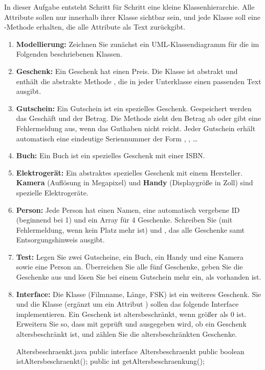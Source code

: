 In dieser Aufgabe entsteht Schritt für Schritt eine kleine Klassenhierarchie. Alle Attribute sollen nur innerhalb ihrer Klasse sichtbar sein, und jede Klasse soll eine -Methode erhalten, die alle Attribute als Text zurückgibt.
\begin{enumerate}[label=\alph*)]
\item \textbf{Modellierung:} Zeichnen Sie zunächst ein UML-Klassendiagramm für die im Folgenden beschriebenen Klassen.
\item \textbf{Geschenk:} Ein Geschenk hat einen Preis. Die Klasse ist abstrakt und enthält die abstrakte Methode , die in jeder Unterklasse einen passenden Text ausgibt.
\item \textbf{Gutschein:} Ein Gutschein ist ein spezielles Geschenk. Gespeichert werden das Geschäft und der Betrag. Die Methode  zieht den Betrag ab oder gibt eine Fehlermeldung aus, wenn das Guthaben nicht reicht. Jeder Gutschein erhält automatisch eine eindeutige Seriennummer der Form , , \ldots
\item \textbf{Buch:} Ein Buch ist ein spezielles Geschenk mit einer ISBN.
\item \textbf{Elektrogerät:} Ein abstraktes spezielles Geschenk mit einem Hersteller. \textbf{Kamera} (Auflösung in Megapixel) und \textbf{Handy} (Displaygröße in Zoll) sind spezielle Elektrogeräte.
\item \textbf{Person:} Jede Person hat einen Namen, eine automatisch vergebene ID (beginnend bei 1) und ein Array für 4 Geschenke. Schreiben Sie  (mit Fehlermeldung, wenn kein Platz mehr ist) und , das alle Geschenke samt Entsorgungshinweis ausgibt.
\item \textbf{Test:} Legen Sie zwei Gutscheine, ein Buch, ein Handy und eine Kamera sowie eine Person an. Überreichen Sie alle fünf Geschenke, geben Sie die Geschenke aus und lösen Sie bei einem Gutschein mehr ein, als vorhanden ist.
\item \textbf{Interface:} Die Klasse  (Filmname, Länge, FSK) ist ein weiteres Geschenk. Sie und die Klasse  (ergänzt um ein Attribut ) sollen das folgende Interface implementieren. Ein Geschenk ist altersbeschränkt, wenn  größer als 0 ist. Erweitern Sie  so, dass mit  geprüft und ausgegeben wird, ob ein Geschenk altersbeschränkt ist, und zählen Sie die altersbeschränkten Geschenke.
\begin{javacode}[Ausschnitt]{Altersbeschraenkt.java}
public interface Altersbeschraenkt {
	public boolean istAltersbeschraenkt();
	public int getAltersbeschraenkung();
}
\end{javacode}
\end{enumerate}

